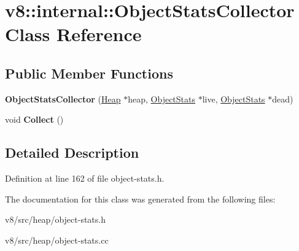 \hypertarget{classv8_1_1internal_1_1ObjectStatsCollector}{}\section{v8\+:\+:internal\+:\+:Object\+Stats\+Collector Class Reference}
\label{classv8_1_1internal_1_1ObjectStatsCollector}
\subsection*{Public Member Functions}
\begin{DoxyCompactItemize}
\item 
\mbox{\label{classv8_1_1internal_1_1ObjectStatsCollector_a63d7cddbff59efd7dd00ab97a5d20b68}} 
{\bfseries Object\+Stats\+Collector} (\mbox{\hyperlink{classv8_1_1internal_1_1Heap}{Heap}} $\ast$heap, \mbox{\hyperlink{classv8_1_1internal_1_1ObjectStats}{Object\+Stats}} $\ast$live, \mbox{\hyperlink{classv8_1_1internal_1_1ObjectStats}{Object\+Stats}} $\ast$dead)
\item 
\mbox{\label{classv8_1_1internal_1_1ObjectStatsCollector_afd62fd6f3928d1905c1b41249b3082b8}} 
void {\bfseries Collect} ()
\end{DoxyCompactItemize}


\subsection{Detailed Description}


Definition at line 162 of file object-\/stats.\+h.



The documentation for this class was generated from the following files\+:\begin{DoxyCompactItemize}
\item 
v8/src/heap/object-\/stats.\+h\item 
v8/src/heap/object-\/stats.\+cc\end{DoxyCompactItemize}
